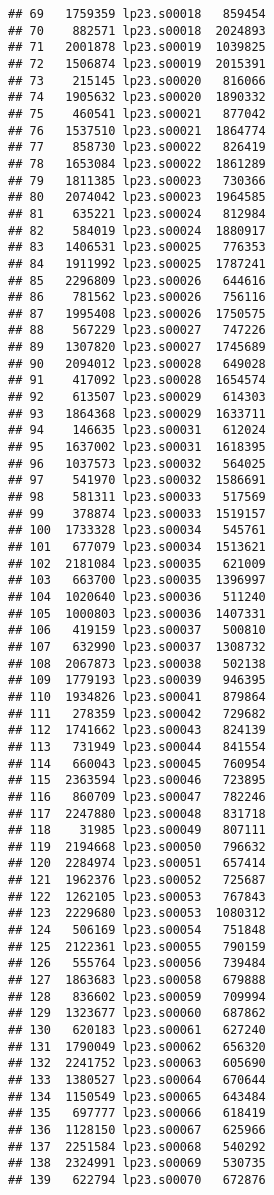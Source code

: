 \documentclass[
]{article}
\begin{document}
\begin{verbatim}
## 69   1759359 lp23.s00018   859454
## 70    882571 lp23.s00018  2024893
## 71   2001878 lp23.s00019  1039825
## 72   1506874 lp23.s00019  2015391
## 73    215145 lp23.s00020   816066
## 74   1905632 lp23.s00020  1890332
## 75    460541 lp23.s00021   877042
## 76   1537510 lp23.s00021  1864774
## 77    858730 lp23.s00022   826419
## 78   1653084 lp23.s00022  1861289
## 79   1811385 lp23.s00023   730366
## 80   2074042 lp23.s00023  1964585
## 81    635221 lp23.s00024   812984
## 82    584019 lp23.s00024  1880917
## 83   1406531 lp23.s00025   776353
## 84   1911992 lp23.s00025  1787241
## 85   2296809 lp23.s00026   644616
## 86    781562 lp23.s00026   756116
## 87   1995408 lp23.s00026  1750575
## 88    567229 lp23.s00027   747226
## 89   1307820 lp23.s00027  1745689
## 90   2094012 lp23.s00028   649028
## 91    417092 lp23.s00028  1654574
## 92    613507 lp23.s00029   614303
## 93   1864368 lp23.s00029  1633711
## 94    146635 lp23.s00031   612024
## 95   1637002 lp23.s00031  1618395
## 96   1037573 lp23.s00032   564025
## 97    541970 lp23.s00032  1586691
## 98    581311 lp23.s00033   517569
## 99    378874 lp23.s00033  1519157
## 100  1733328 lp23.s00034   545761
## 101   677079 lp23.s00034  1513621
## 102  2181084 lp23.s00035   621009
## 103   663700 lp23.s00035  1396997
## 104  1020640 lp23.s00036   511240
## 105  1000803 lp23.s00036  1407331
## 106   419159 lp23.s00037   500810
## 107   632990 lp23.s00037  1308732
## 108  2067873 lp23.s00038   502138
## 109  1779193 lp23.s00039   946395
## 110  1934826 lp23.s00041   879864
## 111   278359 lp23.s00042   729682
## 112  1741662 lp23.s00043   824139
## 113   731949 lp23.s00044   841554
## 114   660043 lp23.s00045   760954
## 115  2363594 lp23.s00046   723895
## 116   860709 lp23.s00047   782246
## 117  2247880 lp23.s00048   831718
## 118    31985 lp23.s00049   807111
## 119  2194668 lp23.s00050   796632
## 120  2284974 lp23.s00051   657414
## 121  1962376 lp23.s00052   725687
## 122  1262105 lp23.s00053   767843
## 123  2229680 lp23.s00053  1080312
## 124   506169 lp23.s00054   751848
## 125  2122361 lp23.s00055   790159
## 126   555764 lp23.s00056   739484
## 127  1863683 lp23.s00058   679888
## 128   836602 lp23.s00059   709994
## 129  1323677 lp23.s00060   687862
## 130   620183 lp23.s00061   627240
## 131  1790049 lp23.s00062   656320
## 132  2241752 lp23.s00063   605690
## 133  1380527 lp23.s00064   670644
## 134  1150549 lp23.s00065   643484
## 135   697777 lp23.s00066   618419
## 136  1128150 lp23.s00067   625966
## 137  2251584 lp23.s00068   540292
## 138  2324991 lp23.s00069   530735
## 139   622794 lp23.s00070   672876

\end{verbatim}
\end{document}

